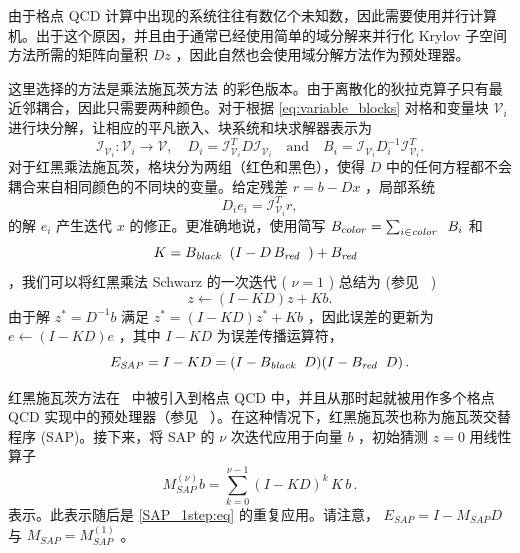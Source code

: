\documentclass{siamltex}
\newcommand{\MSAP}[1]{M_\mathit{SAP}^{(#1)}}
\newcommand{\MSAPone}{M_\mathit{SAP}}
\newcommand{\ESAP}{E_\mathit{SAP}}
\begin{document}
由于格点 QCD 计算中出现的系统往往有数亿个未知数，因此需要使用并行计算机。出于这个原因，并且由于通常已经使用简单的域分解来并行化 Krylov 子空间方法所需的矩阵向量积    $Dz$   ，因此自然也会使用域分解方法作为预处理器。

这里选择的方法是乘法施瓦茨方法    \cite{Schwarz1870, BFSmith_PEBjorstad_WDGropp_1996a}    的彩色版本。由于离散化的狄拉克算子只有最近邻耦合，因此只需要两种颜色。对于根据    \eqref{eq:variable_blocks}    对格和变量块    $\mathcal{V}_i$    进行块分解，让相应的平凡嵌入、块系统和块求解器表示为
\[
  \mathcal{I}_{\mathcal{V}_i} :  \mathcal{V}_i \rightarrow \mathcal{V}, \quad D_i = \mathcal{I}_{\mathcal{V}_i}^T D \mathcal{I}_{\mathcal{V}_i} \quad \text{and} \quad B_i = \mathcal{I}_{\mathcal{V}_i} D_i^{-1} \mathcal{I}_{\mathcal{V}_i}^T.
\]    对于红黑乘法施瓦茨，格块分为两组（红色和黑色），使得    $D$    中的任何方程都不会耦合来自相同颜色的不同块的变量。给定残差    $r=b-Dx$    ，局部系统    \begin{equation} \label{eq:localsystem}
  D_i e_i =  \mathcal{I}_{\mathcal{V}_i}^Tr,
\end{equation}    的解    $e_i$    产生迭代    $x$    的修正。更准确地说，使用简写    $B_{color} = \sum_{i \in \text{\it color \  }} B_{i}$    和
\[
  K = B_{\text{\it black \  }}(I - D\, B_{\text{\it red \  }}) + B_{\text{\it red \  }}
\]    ，我们可以将红黑乘法 Schwarz 的一次迭代 (    $\nu = 1$    ) 总结为 (参见~    \cite{BFSmith_PEBjorstad_WDGropp_1996a}    )
\begin{equation} \label{SAP_1step:eq}
  z \leftarrow (I-KD)z + Kb.
\end{equation}    由于解    $z^* = D^{-1}b$    满足    $z^* = (I-KD)z^* + Kb$    ，因此误差的更新为
$e \leftarrow (I-KD)e$    ，其中    $I-KD$    为误差传播运算符，
\begin{equation*}
  \ESAP = I - KD = (I-B_{\text{\it black \  }}D)(I-B_{\text{\it red \  }}D) \, .
\end{equation*}

红黑施瓦茨方法在~    \cite{Luescher2003}    中被引入到格点 QCD 中，并且从那时起就被用作多个格点 QCD 实现中的预处理器（参见~    \cite{Aoki:2008sm,Nobile2012,Luescher2007}    ）。在这种情况下，红黑施瓦茨也称为施瓦茨交替程序 (SAP)。接下来，将 SAP 的    $\nu$    次迭代应用于向量    $b$    ，初始猜测    $z=0$    用线性算子    \begin{equation*}
  \MSAP{\nu} b = \sum_{k=0}^{\nu-1} (I-KD)^k \, K \, b \,.
\end{equation*}    表示。此表示随后是    \eqref{SAP_1step:eq}    的重复应用。请注意，   $ \ESAP = I - \MSAPone D $    与    $ \MSAPone = \MSAP{1} $    。
\end{document}
